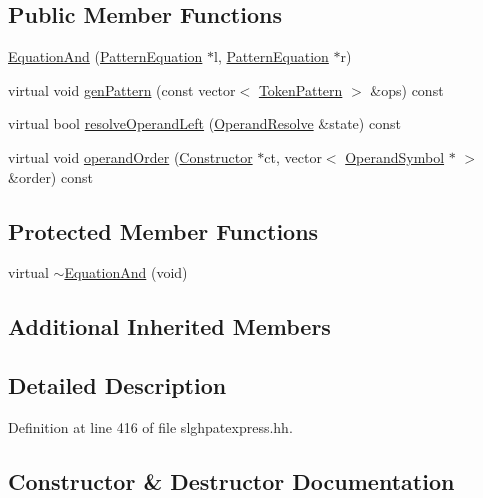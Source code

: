 \subsection*{Public Member Functions}
\begin{DoxyCompactItemize}
\item 
\mbox{\hyperlink{class_equation_and_a136cacccbd9100cbb78ea25b44fc051a}{Equation\+And}} (\mbox{\hyperlink{class_pattern_equation}{Pattern\+Equation}} $\ast$l, \mbox{\hyperlink{class_pattern_equation}{Pattern\+Equation}} $\ast$r)
\item 
virtual void \mbox{\hyperlink{class_equation_and_ae32ea2fa01f596d79ead8028ff34bee4}{gen\+Pattern}} (const vector$<$ \mbox{\hyperlink{class_token_pattern}{Token\+Pattern}} $>$ \&ops) const
\item 
virtual bool \mbox{\hyperlink{class_equation_and_a794c3ebf0951a854cdd31b99cce09937}{resolve\+Operand\+Left}} (\mbox{\hyperlink{struct_operand_resolve}{Operand\+Resolve}} \&state) const
\item 
virtual void \mbox{\hyperlink{class_equation_and_a6afd29fe0c292441a2fb1edf671ba5ef}{operand\+Order}} (\mbox{\hyperlink{class_constructor}{Constructor}} $\ast$ct, vector$<$ \mbox{\hyperlink{class_operand_symbol}{Operand\+Symbol}} $\ast$ $>$ \&order) const
\end{DoxyCompactItemize}
\subsection*{Protected Member Functions}
\begin{DoxyCompactItemize}
\item 
virtual \mbox{\hyperlink{class_equation_and_af2a13c44c2896bf2d26263505ce91bb3}{$\sim$\+Equation\+And}} (void)
\end{DoxyCompactItemize}
\subsection*{Additional Inherited Members}


\subsection{Detailed Description}


Definition at line 416 of file slghpatexpress.\+hh.



\subsection{Constructor \& Destructor Documentation}
\mbox{\label{class_equation_and_af2a13c44c2896bf2d26263505ce91bb3}} 
